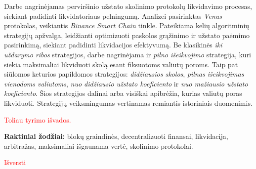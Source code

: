 \documentclass[]{VUMIFTemplateClass}
\begin{document}

\singlespacing


\tableofcontents

\onehalfspacing

Darbe nagrinėjamas perviršinio užstato skolinimo protokolų likvidavimo procesas, siekiant padidinti likvidatoriaus pelningumą. Analizei pasirinktas \textit{Venus} protokolas, veikiantis \textit{Binance Smart Chain} tinkle. Pateikiama kelių algoritminių strategijų apžvalga, leidžianti optimizuoti paskolos grąžinimo ir užstato paėmimo pasirinkimą, siekiant padidinti likvidacijos efektyvumą. Be klasikinės \textit{iki uždarymo ribos} strategijos, darbe nagrinėjama ir \textit{pilno išeikvojimo} strategija, kuri siekia maksimaliai likviduoti skolą esant fiksuotoms valiutų poroms. Taip pat siūlomos keturios papildomos strategijos: \textit{didžiausios skolos}, \textit{pilnas išeikvojimas vienodoms valiutoms}, \textit{nuo didžiausio užstato koeficiento} ir \textit{nuo mažiausio užstato koeficiento}. Šios strategijos dalinai arba visiškai apibrėžia, kurias valiutų poras likviduoti. Strategijų veiksmingumas vertinamas remiantis istoriniais duomenimis.

\textcolor{red}{Toliau tyrimo išvados.}


\noindent\textbf{Raktiniai žodžiai:} blokų graindinės, decentralizuoti finansai, likvidacija, arbitražas, maksimaliai išgaunama vertė, skolinimo protokolai.

\textcolor{red}{Išversti}
\end{document}
